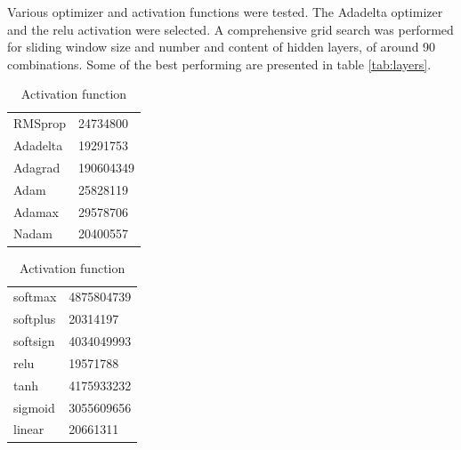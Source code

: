 \documentclass[12pt]{article}
\begin{document}
  Various optimizer and activation functions were tested. The Adadelta optimizer and the 
  relu activation were selected. A comprehensive grid search was performed for sliding window size and number 
  and content of hidden layers, of around 90 combinations. Some of the best performing are presented 
  in table \ref{tab:layers}.

  \begin{table}
    \caption{Selecting optimizer and activation. Scores are averaged MSE.}
    \begin{minipage}{.5\linewidth}
      \caption*{Optimizer}
      \centering
        \begin{tabular}{ll}
            RMSprop & 24734800\\
            Adadelta & 19291753\\
            Adagrad & 190604349\\
            Adam & 25828119\\
            Adamax & 29578706\\
            Nadam & 20400557
        \end{tabular}
    \end{minipage}%
    \begin{minipage}{.5\linewidth}
      \centering
        \caption*{Activation function}
        \begin{tabular}{ll}
            softmax & 4875804739\\
            softplus & 20314197\\
            softsign & 4034049993\\
            relu & 19571788\\
            tanh & 4175933232\\
            sigmoid & 3055609656\\
            linear & 20661311
        \end{tabular}
    \end{minipage}
  \end{table}
\end{document}
